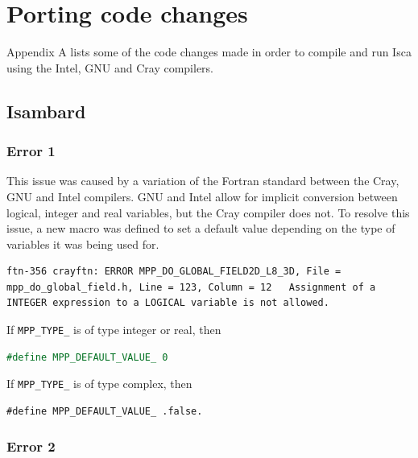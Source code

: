 \documentclass[a4paper,11pt]{report}
\begin{document}



%
\newpage
{}
\printbibliography
%

\appendix
\chapter{Porting code changes}
\label{apdx:porting}
Appendix A lists some of the code changes made in order to compile and run Isca using the Intel, GNU and Cray compilers. 
\section*{Isambard}
\subsection*{Error 1}
This issue was caused by a variation of the Fortran standard between the Cray, GNU and Intel compilers. GNU and Intel allow for implicit conversion between logical, integer and real variables, but the Cray compiler does not. To resolve this issue, a new macro was defined to set a default value depending on the type of variables it was being used for. 
\begin{lstlisting}
ftn-356 crayftn: ERROR MPP_DO_GLOBAL_FIELD2D_L8_3D, File = mpp_do_global_field.h, Line = 123, Column = 12   Assignment of a INTEGER expression to a LOGICAL variable is not allowed.
\end{lstlisting}

If \texttt{MPP\_TYPE\_} is of type integer or real, then 
\begin{lstlisting}[language=Fortran]
#define MPP_DEFAULT_VALUE_ 0
\end{lstlisting}
\par
If \texttt{MPP\_TYPE\_} is of type complex, then 
\begin{lstlisting}
#define MPP_DEFAULT_VALUE_ .false.
\end{lstlisting}

\subsection*{Error 2}
\end{document}
